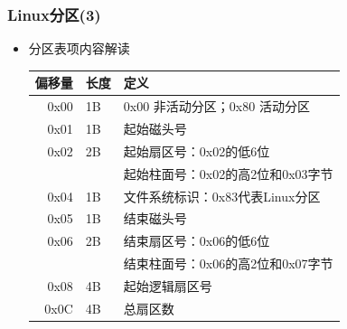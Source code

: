 \documentclass[xcolor=svgnames,presentation]{beamer}
\begin{document}
\begin{frame}
\frametitle{Linux分区(3)}
\label{sec-1-5}
\begin{itemize}

\item 分区表项内容解读\\
\label{sec-1-5-1}%
\begin{center}
\begin{tabular}{rll}
 偏移量  &  长度  &  定义                               \\
\hline
   0x00  &  1B    &  0x00 非活动分区；0x80 活动分区     \\
   0x01  &  1B    &  起始磁头号                         \\
   0x02  &  2B    &  起始扇区号：0x02的低6位            \\
         &        &  起始柱面号：0x02的高2位和0x03字节  \\
   0x04  &  1B    &  文件系统标识：0x83代表Linux分区    \\
   0x05  &  1B    &  结束磁头号                         \\
   0x06  &  2B    &  结束扇区号：0x06的低6位            \\
         &        &  结束柱面号：0x06的高2位和0x07字节  \\
   0x08  &  4B    &  起始逻辑扇区号                     \\
   0x0C  &  4B    &  总扇区数                           \\
\end{tabular}
\end{center}


\end{itemize} %
\end{frame}
\end{document}
